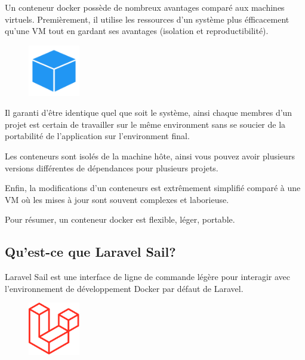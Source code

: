 \documentclass[internal]{nhitec_design}
\begin{document}
        Un conteneur docker possède de nombreux avantages comparé aux machines virtuels. Premièrement, il utilise les ressources d'un système plus éfficacement qu'une VM tout en gardant ses avantages (isolation et reproductibilité). 

        \begin{figure}
            \centering
            \includegraphics[width=0.2\textwidth]{Images_formation/Iconconteneur.png}
        \end{figure}

        Il garanti d'être identique quel que soit le système, ainsi chaque membres d'un projet est certain de travailler sur le même environment sans se soucier de la portabilité de l'application sur l'environment final.
        
        Les conteneurs sont isolés de la machine hôte, ainsi vous pouvez avoir plusieurs versions différentes de dépendances pour plusieurs projets.

        Enfin, la modifications d'un conteneurs est extrêmement simplifié comparé à une VM où les mises à jour sont souvent complexes et laborieuse.

        Pour résumer, un conteneur docker est flexible, léger, portable.

        
\newpage

    \subsection{Qu'est-ce que Laravel Sail?}
        
        Laravel Sail est une interface de ligne de commande légère pour interagir avec l'environnement de développement Docker par défaut de Laravel. 
        
        \begin{figure}
            \centering
            \includegraphics[width=0.2\textwidth]{Images_formation/LaravelLogo.png}
        \end{figure}
        
\end{document}
